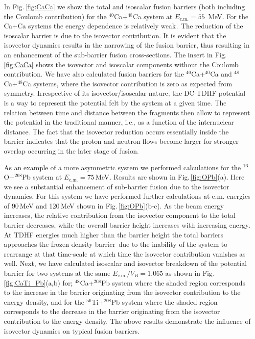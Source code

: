 \documentclass[aps,prl,twocolumn,superscriptaddress,floatfix,10pt]{revtex4-1}
\begin{document}
In Fig.\,\ref{fig:CaCa} we show the total and isoscalar fusion barriers (both including the Coulomb contribution)
for the $^{40}$Ca+$^{48}$Ca system at $E_\mathrm{c.m.}=55$~MeV.
 For the Ca+Ca systems the energy dependence is relatively
weak\,\cite{keser2012,umar2014a,washiyama2008}.
The reduction of the isoscalar barrier is due to the isovector contribution. It is evident that
the isovector dynamics results in the narrowing of the fusion barrier, thus resulting in an enhancement of the sub-barrier
fusion cross-sections. The insert in Fig.\,\ref{fig:CaCa} shows the isovector and isoscalar components without the Coulomb contribution.
We have also calculated fusion barriers for the $^{40}$Ca+$^{40}$Ca and $^{48}$Ca+$^{48}$Ca systems, where the isovector contribution is
zero as expected from symmetry.
Irrespective of its isovector/isoscalar nature, the DC-TDHF potential is a way to represent the potential felt by the system at a given time. The relation between time and distance between the fragments then allow to represent the potential in the traditional manner, i.e., as a function of the internuclear distance. The fact that the isovector reduction occurs essentially inside the barrier indicates that the proton and neutron flows become larger for stronger overlap occurring in the later stage of fusion.

As an example of a more asymmetric system we performed calculations for the $^{16}$O+$^{208}$Pb system
at $E_{\mathrm{c.m.}}=75$\,MeV. Results are shown in Fig.\,\ref{fig:OPb}(a). Here we see a
substantial enhancement of sub-barrier fusion due to the isovector dynamics.
For this system we have performed further
calculations at c.m. energies of 90\,MeV and 120\,MeV shown in Fig.\,\ref{fig:OPb}(b-c).
As the beam energy  increases, the
relative contribution from the isovector component to the total barrier decreases, while the overall barrier height increases with
increasing energy. At TDHF energies much higher than the barrier height the total barriers approaches the frozen density
barrier\,\cite{washiyama2008,umar2014a}
due to the inability of the system to rearrange at that time-scale at which time the isovector contribution vanishes as well.
Next, we have calculated isoscalar and isovector breakdown of the potential barrier for two
systems at the same $E_\mathrm{c.m.}/V_B=1.065$ as shown in Fig.\,\ref{fig:CaTi_Pb}(a,b) for;
$^{48}$Ca+$^{208}$Pb system where the shaded region corresponds to the increase in the barrier
originating
from the isovector contribution to the energy density, and for the
$^{50}$Ti+$^{208}$Pb system where
the shaded region corresponds to the decrease in the barrier originating from the isovector
contribution to
the energy density.
The above results demonstrate the influence of isovector dynamics on typical fusion barriers.
\end{document}
